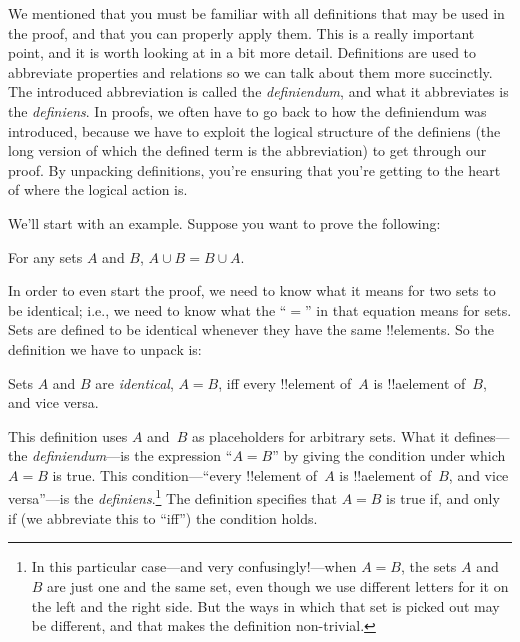 \documentclass[../../../include/open-logic-section]{subfiles}
\begin{document}


We mentioned that you must be familiar with all definitions that may
be used in the proof, and that you can properly apply them. This is a
really important point, and it is worth looking at in a bit more
detail. Definitions are used to abbreviate properties and relations so
we can talk about them more succinctly. The introduced abbreviation is
called the \emph{definiendum}, and what it abbreviates is the
\emph{definiens}.  In proofs, we often have to go back to how the
definiendum was introduced, because we have to exploit the logical
structure of the definiens (the long version of which the defined term
is the abbreviation) to get through our proof.  By unpacking
definitions, you're ensuring that you're getting to the heart of where
the logical action is.

We'll start with an example. Suppose you want to prove the following:

\begin{prop}
For any sets $A$ and $B$, $A \cup B = B \cup A$.
\end{prop}

In order to even start the proof, we need to know what it means for
two sets to be identical; i.e., we need to know what the ``$=$'' in
that equation means for sets.  Sets are defined to be identical
whenever they have the same !!{element}s.  So the definition we have
to unpack is:

\begin{defn}
Sets $A$ and $B$ are \emph{identical}, $A = B$, iff every !!{element}
of~$A$ is !!a{element} of~$B$, and vice versa.
\end{defn}

This definition uses $A$ and~$B$ as placeholders for arbitrary
sets. What it defines---the \emph{definiendum}---is the expression
``$A = B$'' by giving the condition under which $A = B$ is true.  This
condition---``every !!{element} of~$A$ is !!a{element} of~$B$, and
vice versa''---is the \emph{definiens}.\footnote{In this particular
  case---and very confusingly!---when $A = B$, the sets $A$ and $B$
  are just one and the same set, even though we use different letters
  for it on the left and the right side.  But the ways in which that
  set is picked out may be different, and that makes the definition
  non-trivial.} The definition specifies that $A = B$ is true if, and
only if (we abbreviate this to ``iff'') the condition holds.
\end{document}
